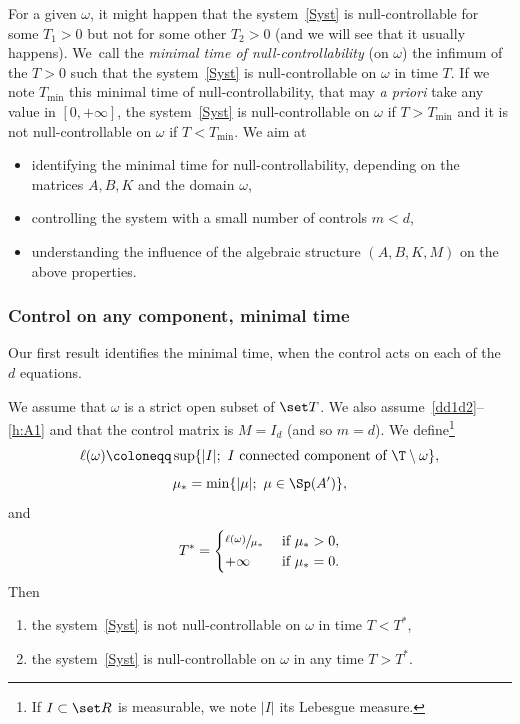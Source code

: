 For a given $\omega$, it might happen that the system~\eqref{Syst} is null-controllable for some $T_1>0$ but not for some other $T_2>0$ (and we will see that it usually happens). We~call the \emph{minimal time of null-controllability} (on $\omega$) the infimum of the $T>0$ such that the system~\eqref{Syst} is null-controllable on $\omega$ in time $T$. If we note $T_{\mathrm{min}}$ this minimal time of null-controllability, that may \emph{a priori} take any value in $[0,+\infty]$, the system~\eqref{Syst} is null-controllable on $\omega$ if $T>T_{\mathrm{min}}$ and it is not null-controllable on $\omega$ if $T<T_{\mathrm{min}}$. We aim at
\begin{itemize}
\item identifying the minimal time for null-controllability, depending on the matrices $A,B,K$ and the domain $\omega$,
\item controlling the system with a small number of controls $m<d$,
\item understanding the influence of the algebraic structure $(A,B,K,M)$ on the above properties.
\end{itemize}


\subsubsection{Control on any component, minimal time}

Our first result identifies the minimal time, when the control acts on each of the $d$ equations.
\begin{theorem}\label{th:main}
We assume that $\omega$ is a strict open subset of $\set T$. We also assume~\eqref{dd1d2}--\eqref{h:A1} and that the control matrix is $M=I_d$ (and so $m=d$).
We define\footnote{If $I\subset \set R$ is measurable, we note $|I|$ its Lebesgue measure.}
\begin{equation}\label{eq:def_l}\ell(\omega) \coloneqq \sup\{ |I|;\ I \text{ connected component of } \T \setminus \omega \},\end{equation}
\[
\mu_*=\min\{ |\mu|;\ \mu \in \Sp(A') \},
\]
and
\begin{equation}\label{eq:T}
T^\ast =
\begin{cases}
\sfrac{\ell(\omega)}{\mu_*} & \text{ if } \mu_* >0, \\
+\infty & \text{ if } \mu_*=0.
\end{cases}
\end{equation}
Then
\begin{enumerate}
\item
\label{th:maini} the system~\eqref{Syst} is not null-controllable on $\omega$ in time $T<T^\ast$,
\item\label{th:mainii} the system~\eqref{Syst} is null-controllable on $\omega$ in any time $T>T^\ast$.
\end{enumerate}
\end{theorem}

